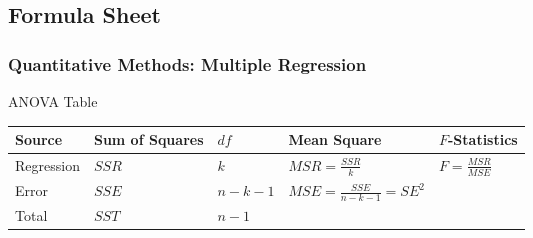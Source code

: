 \subsection{Formula Sheet}

\subsubsection{Quantitative Methods: Multiple Regression}

ANOVA Table\\
\begin{tabularx}{\textwidth}{X|X|X|p{12em}|X}
\hline
\rowcolor{gray!30}
Source & Sum of Squares & $df$ & Mean Square & $F$-Statistics \\
\hline
Regression & $SSR$ & $k$ & $MSR = \frac{SSR}{k}$ & $F = \frac{MSR}{MSE}$ \\
Error & $SSE$ & $n-k-1$ & $MSE = \frac{SSE}{n-k-1} = SE^2$ & \\
Total & $SST$ & $n-1$ & &\\
\hline
\end{tabularx}

